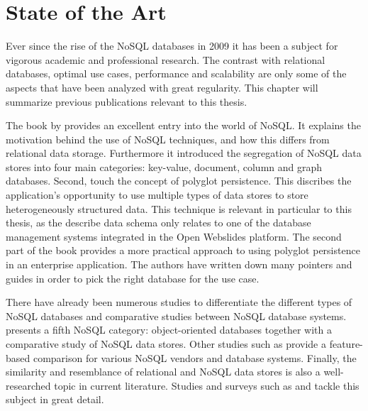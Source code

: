 \chapter{State of the Art}
\label{ch:state-of-the-art}

Ever since the rise of the NoSQL databases in 2009 \autocite{Sadalage2012} it has been a subject for vigorous academic and professional research. The contrast with relational databases, optimal use cases, performance and scalability are only some of the aspects that have been analyzed with great regularity. This chapter will summarize previous publications relevant to this thesis.


The book by \textcite{Sadalage2012} provides an excellent entry into the world of NoSQL. It explains the motivation behind the use of NoSQL techniques, and how this differs from relational data storage. Furthermore it introduced the segregation of NoSQL data stores into four main categories: key-value, document, column and graph databases.
Second, \citeauthor{Sadalage2012} touch the concept of polyglot persistence. This discribes the application's opportunity to use multiple types of data stores to store heterogeneously structured data. This technique is relevant in particular to this thesis, as the describe data schema only relates to one of the database management systems integrated in the Open Webslides platform.
The second part of the book provides a more practical approach to using polyglot persistence in an enterprise application. The authors have written down many pointers and guides in order to pick the right database for the use case.

There have already been numerous studies to differentiate the different types of NoSQL databases and comparative studies between NoSQL database systems. \textcite{Nayak2013} presents a fifth NoSQL category: object-oriented databases together with a comparative study of NoSQL data stores.
Other studies such as \textcite{Moniruzzaman2013} provide a feature-based comparison for various NoSQL vendors and database systems.
Finally, the similarity and resemblance of relational and NoSQL data stores is also a well-researched topic in current literature. Studies and surveys such as \textcite{Mohamed2014} and \textcite{Cattell2010} tackle this subject in great detail.

